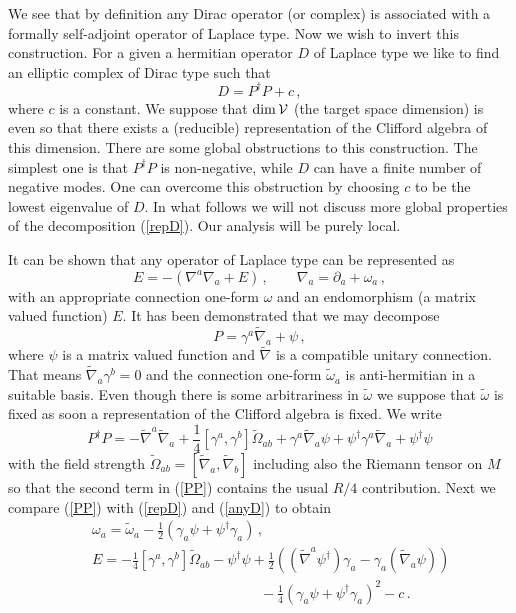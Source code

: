 \documentclass[a4paper,12pt,twoside]{article}
\begin{document}
We see that by definition any Dirac operator (or complex)
is associated with a formally self-adjoint operator of
Laplace type. Now we wish to invert this construction.
For a given a hermitian operator $D$ of Laplace type we like to find
an elliptic complex of Dirac type such that
\begin{equation}
D=P^\dag P +c\,,\label{repD}
\end{equation}
where $c$ is a constant. We suppose that ${\rm dim}\,{\cal V}$
(the target space dimension) is even so that there exists
a (reducible) representation of the Clifford algebra of
this dimension. There are some global obstructions
to this construction. The simplest one is that $P^\dag P$
is non-negative, while $D$ can have a finite number of
negative modes. One can overcome this obstruction by
choosing $c$ to be the lowest eigenvalue of $D$.
In what follows we will not discuss more global properties of
the decomposition (\ref{repD}). Our analysis will be purely
local.

It can be shown \cite{Gilkey} that any operator
of Laplace type can be represented as
\begin{equation}
E=-(\nabla^a \nabla_a +E)\,,\qquad \nabla_a =\partial_a +\omega_a\,,
\label{anyD}
\end{equation}
with an appropriate connection one-form $\omega$ and an endomorphism 
(a matrix valued function) $E$. It has been demonstrated \cite{BG92}
that we may decompose 
\begin{equation}
P=\gamma^a\tilde\nabla_a +\psi \,,\label{anyP}
\end{equation}
where $\psi$ is a matrix valued function and $\tilde\nabla$
is a compatible unitary connection. That means
$\tilde\nabla_a\gamma^b=0$ and the connection
one-form $\tilde\omega_a$ is anti-hermitian in a suitable basis. 
Even though there
is some arbitrariness in $\tilde\omega$ we suppose that
$\tilde\omega$ is fixed as soon a representation of the
Clifford algebra is fixed. We write
\begin{equation}
P^\dag P=-\tilde\nabla^a\tilde\nabla_a +\frac 14 [\gamma^a,\gamma^b]
\tilde\Omega_{ab}+\gamma^a\tilde\nabla_a\psi 
+\psi^\dag\gamma^a\tilde\nabla_a +\psi^\dag\psi \label{PP}
\end{equation}
with the field strength $\tilde\Omega_{ab}=[\tilde\nabla_a,\tilde\nabla_b]$
including also the Riemann tensor on $M$ so that
the second term in (\ref{PP}) contains the usual $R/4$ contribution. 
Next we compare (\ref{PP}) with (\ref{repD}) and (\ref{anyD})
to obtain
\begin{eqnarray}
&&\omega_a=\tilde\omega_a -\frac 12 (\gamma_a\psi +\psi^\dag\gamma_a) \,,
\nonumber \\
&&E=-\frac 14 [\gamma^a,\gamma^b]\tilde\Omega_{ab}-\psi^\dag\psi
+\frac 12 ((\tilde\nabla^a\psi^\dag )\gamma_a -\gamma_a (\tilde\nabla_a\psi))
\nonumber \\
&&\qquad\qquad\qquad\qquad \qquad\qquad
-\frac 14 (\gamma_a\psi +\psi^\dag\gamma_a)^2
-c \,.\label{psiE}
\end{eqnarray}
\end{document}
